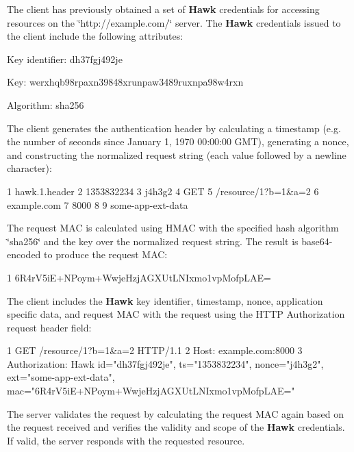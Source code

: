 The client has previously obtained a set of {\bfseries Hawk} credentials for accessing resources on the \char`\"{}http\+://example.\+com/\char`\"{} server. The {\bfseries Hawk} credentials issued to the client include the following attributes\+:


\begin{DoxyItemize}
\item Key identifier\+: dh37fgj492je
\item Key\+: werxhqb98rpaxn39848xrunpaw3489ruxnpa98w4rxn
\item Algorithm\+: sha256
\end{DoxyItemize}

The client generates the authentication header by calculating a timestamp (e.\+g. the number of seconds since January 1, 1970 00\+:00\+:00 G\+M\+T), generating a nonce, and constructing the normalized request string (each value followed by a newline character)\+:


\begin{DoxyCode}
1 hawk.1.header
2 1353832234
3 j4h3g2
4 GET
5 /resource/1?b=1&a=2
6 example.com
7 8000
8 
9 some-app-ext-data
\end{DoxyCode}


The request M\+A\+C is calculated using H\+M\+A\+C with the specified hash algorithm \char`\"{}sha256\char`\"{} and the key over the normalized request string. The result is base64-\/encoded to produce the request M\+A\+C\+:


\begin{DoxyCode}
1 6R4rV5iE+NPoym+WwjeHzjAGXUtLNIxmo1vpMofpLAE=
\end{DoxyCode}


The client includes the {\bfseries Hawk} key identifier, timestamp, nonce, application specific data, and request M\+A\+C with the request using the H\+T\+T\+P {\ttfamily Authorization} request header field\+:


\begin{DoxyCode}
1 GET /resource/1?b=1&a=2 HTTP/1.1
2 Host: example.com:8000
3 Authorization: Hawk id="dh37fgj492je", ts="1353832234", nonce="j4h3g2", ext="some-app-ext-data",
       mac="6R4rV5iE+NPoym+WwjeHzjAGXUtLNIxmo1vpMofpLAE="
\end{DoxyCode}


The server validates the request by calculating the request M\+A\+C again based on the request received and verifies the validity and scope of the {\bfseries Hawk} credentials. If valid, the server responds with the requested resource.

